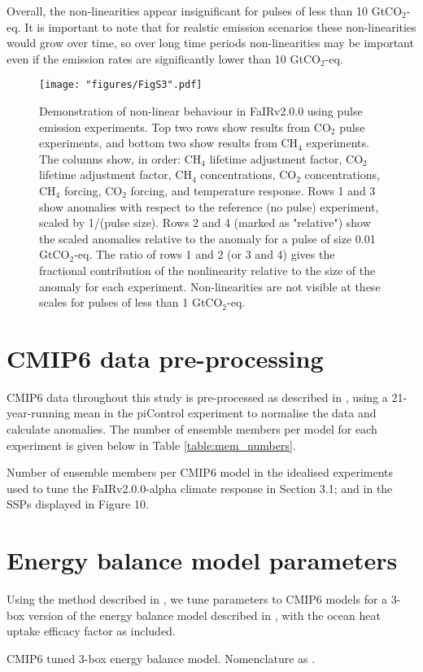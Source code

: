 \documentclass[gmd, manuscript]{copernicus}
\begin{document}
Overall, the non-linearities appear insignificant for pulses of less than 10 GtCO$_2$-eq. It is important to note that for realstic emission scenarios these non-linearities would grow over time, so over long time periods non-linearities may be important even if the emission rates are significantly lower than 10 GtCO$_2$-eq.
%
\begin{figure}[h]
    \texttt{[image: "figures/FigS3".pdf]}
    \caption{Demonstration of non-linear behaviour in FaIRv2.0.0 using pulse emission experiments. Top two rows show results from CO$_2$ pulse experiments, and bottom two show results from CH$_4$ experiments. The columns show, in order: CH$_4$ lifetime adjustment factor, CO$_2$ lifetime adjustment factor, CH$_4$ concentrations, CO$_2$ concentrations, CH$_4$ forcing, CO$_2$ forcing, and temperature response. Rows 1 and 3 show anomalies with respect to the reference (no pulse) experiment, scaled by 1/(pulse size). Rows 2 and 4 (marked as "relative") show the scaled anomalies relative to the anomaly for a pulse of size 0.01 GtCO$_2$-eq. The ratio of rows 1 and 2 (or 3 and 4) gives the fractional contribution of the nonlinearity relative to the size of the anomaly for each experiment. Non-linearities are not visible at these scales for pulses of less than 1 GtCO$_2$-eq.}
    \label{fig:nonlinearities}
\end{figure}
%
\section{CMIP6 data pre-processing}
CMIP6 data throughout this study is pre-processed as described in \citet{Nicholls2021}, using a 21-year-running mean in the piControl experiment to normalise the data and calculate anomalies. The number of ensemble members per model for each experiment is given below in Table \ref{table:mem_numbers}.
\begin{table}[h]
    \caption{Number of ensemble members per CMIP6 model in the idealised experiments used to tune the FaIRv2.0.0-alpha climate response in Section 3.1; and in the SSPs displayed in Figure 10.}
    \label{table:mem_numbers}
    {\scriptsize
    \renewcommand{\arraystretch}{0.75}
    
    }
\end{table}
\clearpage
%
\section{Energy balance model parameters}
Using the method described in \cite{Cummins2020}, we tune parameters to CMIP6 models for a 3-box version of the energy balance model described in \cite{Geoffroy2013}, with the ocean heat uptake efficacy factor as \cite{Winton2010} included. 
\begin{table}[h]
    \caption{CMIP6 tuned 3-box energy balance model. Nomenclature as \citet{Cummins2020}.}
    \label{table:EB_p}
    \renewcommand{\arraystretch}{0.9}
    
\end{table}
\clearpage
%
\end{document}
